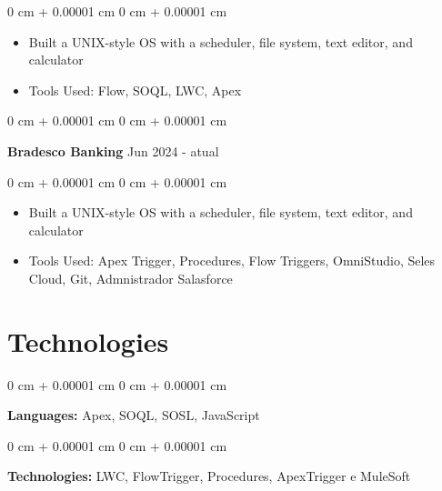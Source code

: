 \documentclass[10pt, letterpaper]{article}
\newenvironment{highlights}{
    \begin{itemize}[
        topsep=0.10 cm,
        parsep=0.10 cm,
        partopsep=0pt,
        itemsep=0pt,
        leftmargin=0 cm + 10pt
    ]
}{
    \end{itemize}
} %
\newenvironment{onecolentry}{
    \begin{adjustwidth}{
        0 cm + 0.00001 cm
    }{
        0 cm + 0.00001 cm
    }
}{
    \end{adjustwidth}
} %
\newenvironment{twocolentry}[2][]{
    \onecolentry
    \def\secondColumn{#2}
    \setcolumnwidth{\fill, 4.5 cm}
    \begin{paracol}{2}
}{
    \switchcolumn \raggedleft \secondColumn
    \end{paracol}
    \endonecolentry
} %
\begin{document}
        \vspace{0.10 cm}
        \begin{onecolentry}
            \begin{highlights}
                \item Built a UNIX-style OS with a scheduler, file system, text editor, and calculator
                \item Tools Used: Flow, SOQL, LWC, Apex
            \end{highlights}
        \end{onecolentry}        


        \vspace{0.2 cm}

        \begin{twocolentry}{
            Jun 2024 - atual
        }
        
            \textbf{Bradesco Banking}\end{twocolentry}

        \vspace{0.10 cm}
        \begin{onecolentry}
            \begin{highlights}
                \item Built a UNIX-style OS with a scheduler, file system, text editor, and calculator
                \item Tools Used: Apex Trigger, Procedures, Flow Triggers, OmniStudio, Seles Cloud, Git, Admnistrador Salasforce
            \end{highlights}
        \end{onecolentry}
        

        

    
    \section{Technologies}



        
        \begin{onecolentry}
            \textbf{Languages:} Apex, SOQL, SOSL, JavaScript
        \end{onecolentry}

        \vspace{0.2 cm}

        \begin{onecolentry}
            \textbf{Technologies:} LWC, FlowTrigger, Procedures, ApexTrigger e MuleSoft
        \end{onecolentry}
\end{document}
